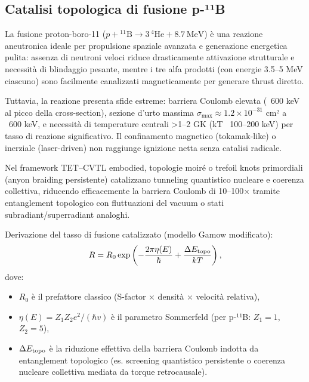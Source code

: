 \documentclass[11pt,a4paper]{article}
\theoremstyle{plain}
\theoremstyle{definition}
\begin{document}
\vspace{0.4cm}

\subsection{Catalisi topologica di fusione p-¹¹B}

La fusione proton-boro-11 ($p + {}^{11}\mathrm{B} \to 3 \, {}^{4}\mathrm{He} + 8.7\,\mathrm{MeV}$) è una reazione aneutronica ideale per propulsione spaziale avanzata e generazione energetica pulita: assenza di neutroni veloci riduce drasticamente attivazione strutturale e necessità di blindaggio pesante, mentre i tre alfa prodotti (con energie 3.5–5 MeV ciascuno) sono facilmente canalizzati magneticamente per generare thrust diretto.


\vspace{0.2cm}

Tuttavia, la reazione presenta sfide estreme: barriera Coulomb elevata (~600 keV al picco della cross-section), sezione d'urto massima $\sigma_{\max} \approx 1.2 \times 10^{-31}$ cm² a ~600 keV, e necessità di temperature centrali >1–2 GK (kT ~100–200 keV) per tasso di reazione significativo. Il confinamento magnetico (tokamak-like) o inerziale (laser-driven) non raggiunge ignizione netta senza catalisi radicale.

\vspace{0.2cm}

Nel framework TET–CVTL embodied, topologie moiré o trefoil knots primordiali (anyon braiding persistente) catalizzano tunneling quantistico nucleare e coerenza collettiva, riducendo efficacemente la barriera Coulomb di 10–100× tramite entanglement topologico con fluttuazioni del vacuum o stati subradiant/superradiant analoghi.

\vspace{0.2cm}

Derivazione del tasso di fusione catalizzato (modello Gamow modificato):
\begin{equation}
    R = R_0 \exp\left( -\frac{2\pi \eta(E)}{\hbar} + \frac{\Delta E_{\rm topo}}{kT} \right),
    \label{eq:rate_catalizzato}
\end{equation}
dove:

\vspace{0.2cm}
\begin{itemize}
    \item $R_0$ è il prefattore classico (S-factor $\times$ densità $\times$ velocità relativa),
    \item $\eta(E) = Z_1 Z_2 e^2 / (\hbar v)$ è il parametro Sommerfeld (per p-¹¹B: $Z_1=1$, $Z_2=5$),
    \item $\Delta E_{\rm topo}$ è la riduzione effettiva della barriera Coulomb indotta da entanglement topologico (es. screening quantistico persistente o coerenza nucleare collettiva mediata da torque retrocausale).
\end{itemize}
\end{document}
